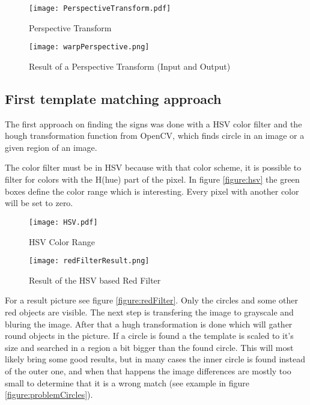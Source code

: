 \begin{figure}[H]
\begin{center}
  \texttt{[image: PerspectiveTransform.pdf]}
  \caption[]{Perspective Transform}
  \label{figure:perspective}
\end{center}
\end{figure}

\begin{figure}[htp]
\begin{center}
  \texttt{[image: warpPerspective.png]}
  \caption{Result of a Perspective Transform (Input and Output)}
  \label{figure:perspectiveResult}
\end{center}
\end{figure}


\subsection{First template matching approach}
The first approach on finding the signs was done with a HSV color filter and the hough transformation
function from OpenCV, which finds circle in an image or a given region of an image.

The color filter must be in HSV because with that color scheme, it is possible to filter for colors
with the H(hue) part of the pixel. In figure \vref{figure:hsv} the green boxes define the color range
which is interesting. Every pixel with another color will be set to zero. 

\begin{figure}[htp]
\begin{center}
  \texttt{[image: HSV.pdf]}
  \caption{HSV Color Range}
  \label{figure:hsv}
\end{center}
\end{figure}


\begin{figure}[htp]
\begin{center}
  \texttt{[image: redFilterResult.png]}
  \caption{Result of the HSV based Red Filter}
  \label{figure:redFilter}
\end{center}
\end{figure}


For a result picture see figure \vref{figure:redFilter}. 
Only the circles and some other red objects are visible. 
The next step is transfering the image to grayscale and 
bluring the image. After that a hugh transformation is done which will gather round
objects in the picture. If a circle is found a the template is scaled to it's size and 
searched in a region a bit bigger than the found circle. This will most likely bring some good results, 
but in many cases the inner circle is found instead of the outer one, and when that happens the image 
differences are mostly too small to determine that it is a wrong match
(see example in figure \vref{figure:problemCircles}).

